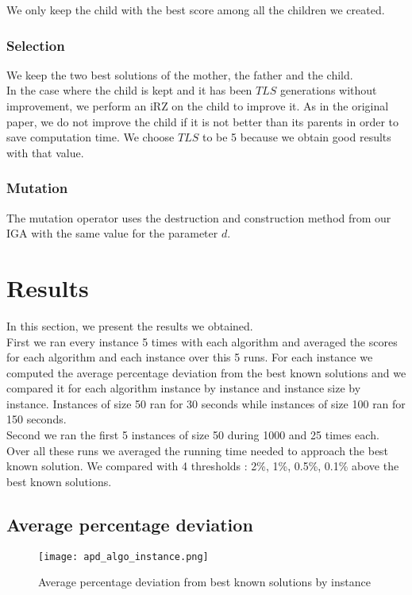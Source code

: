 \documentclass[a4paper,10pt]{article}
\begin{document}
			We only keep the child with the best score among all the children we created.

		\subsubsection{Selection}
			We keep the two best solutions of the mother, the father and the child. \\
			In the case where the child is kept and it has been $TLS$ generations without improvement, we perform an iRZ on the child to improve it. As in the original paper, we do not improve the child if it is not better than its parents in order to save computation time. We choose $TLS$ to be 5 because we obtain good results with that value.

		\subsubsection{Mutation}
			The mutation operator uses the destruction and construction method from our IGA with the same value for the parameter $d$.

\section{Results}

	In this section, we present the results we obtained. \\
	First we ran every instance 5 times with each algorithm and averaged the scores for each algorithm and each instance over this 5 runs. For each instance we computed the average percentage deviation from the best known solutions and we compared it for each algorithm instance by instance and instance size by instance. Instances of size 50 ran for 30 seconds while instances of size 100 ran for 150 seconds. \\

	Second we ran the first 5 instances of size 50 during 1000 and 25 times each. Over all these runs we averaged the running time needed to approach the best known solution. We compared with 4 thresholds : 2\%, 1\%, 0.5\%, 0.1\% above the best known solutions.

	\subsection{Average percentage deviation}

		\begin{figure}[H]
			\centering
			\label{apd_algo_instance}
			\caption{Average percentage deviation from best known solutions by instance}
			\texttt{[image: apd\_algo\_instance.png]}
		\end{figure}
\end{document}
